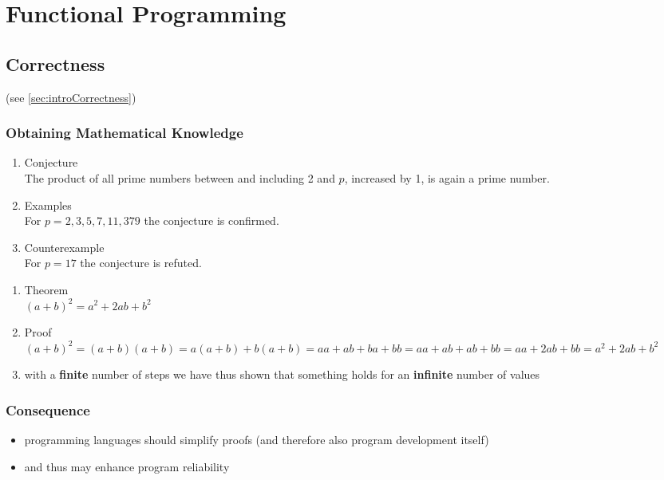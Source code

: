 \section{Functional Programming}
\begin{multicols}{2}
\subsection{Correctness}
(see \ref{sec:introCorrectness})

\subsubsection{Obtaining Mathematical Knowledge}
\begin{enumerate}
  \item Conjecture\\
  The product of all prime numbers between and including 2 and $p$, increased by 1, is again a prime number.
  \item Examples\\
  For $p = 2,3,5,7,11,379$ the conjecture is confirmed.
  \item Counterexample\\
  For $p=17$ the conjecture is refuted.
\end{enumerate}

\begin{enumerate}
  \item Theorem\\
  $(a+b)^2 = a^2 + 2ab + b^2$
  \item Proof\\
  $(a+b)^2 = (a+b)(a+b) = a(a+b) + b(a+b) = aa + ab + ba + bb = aa + ab + ab + bb = aa + 2ab + bb = a^2 + 2ab + b^2$
  \item[\-] with a \textbf{finite} number of steps we have thus shown that something holds for an \textbf{infinite} number of values
\end{enumerate}

\subsubsection{Consequence}
\begin{itemize}
  \item programming languages should simplify proofs (and therefore also program development itself)
  \item and thus may enhance program reliability
\end{itemize}


\end{multicols}
